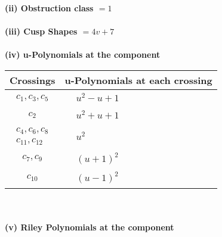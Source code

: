 \documentclass[1p]{elsarticle_modified}
\theoremstyle{definition}
\begin{document}
\flushleft \textbf{(ii) Obstruction class $= 1$}\\~\\
\flushleft \textbf{(iii) Cusp Shapes $= 4 v+7$}\\~\\
\newpage\renewcommand{\arraystretch}{1}
\flushleft \textbf{(iv) u-Polynomials at the component}\newline \\
\begin{tabular}{m{50pt}|m{274pt}}
Crossings & \hspace{64pt}u-Polynomials at each crossing \\
\hline $$\begin{aligned}c_{1},c_{3},c_{5}\end{aligned}$$&$\begin{aligned}
&u^2- u+1
\end{aligned}$\\
\hline $$\begin{aligned}c_{2}\end{aligned}$$&$\begin{aligned}
&u^2+u+1
\end{aligned}$\\
\hline $$\begin{aligned}c_{4},c_{6},c_{8}\\c_{11},c_{12}\end{aligned}$$&$\begin{aligned}
&u^2
\end{aligned}$\\
\hline $$\begin{aligned}c_{7},c_{9}\end{aligned}$$&$\begin{aligned}
&(u+1)^2
\end{aligned}$\\
\hline $$\begin{aligned}c_{10}\end{aligned}$$&$\begin{aligned}
&(u-1)^2
\end{aligned}$\\
\hline
\end{tabular}\\~\\
\newpage\renewcommand{\arraystretch}{1}
\flushleft \textbf{(v) Riley Polynomials at the component}\newline \\
\end{document}
